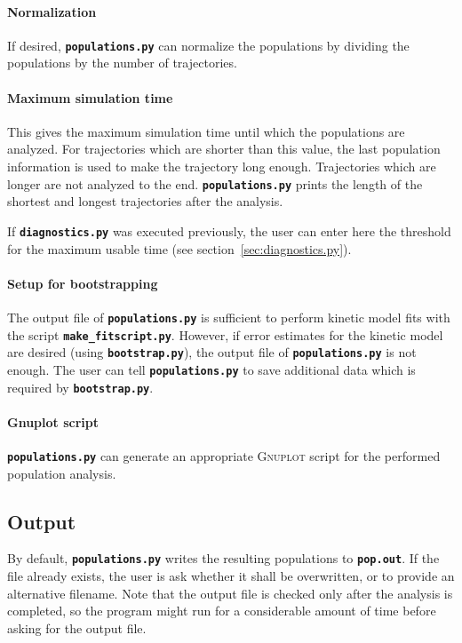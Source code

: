 \documentclass[a4paper,10pt,DIV=15,openany]{scrbook}
\newcommand{\ttt}[1]{\textbf{\texttt{#1}}}
\begin{document}
\paragraph{Normalization}

If desired, \ttt{populations.py} can normalize the populations by dividing the populations by the number of trajectories. 

\paragraph{Maximum simulation time}

This gives the maximum simulation time until which the populations are analyzed. For trajectories which are shorter than this value, the last population information is used to make the trajectory long enough. Trajectories which are longer are not analyzed to the end. \ttt{populations.py} prints the length of the shortest and longest trajectories after the analysis.

If \ttt{diagnostics.py} was executed previously, the user can enter here the threshold for the maximum usable time (see section~\ref{sec:diagnostics.py}).

\paragraph{Setup for bootstrapping}

The output file of \ttt{populations.py} is sufficient to perform kinetic model fits with the script \ttt{make\_fitscript.py}.
However, if error estimates for the kinetic model are desired (using \ttt{bootstrap.py}), the output file of \ttt{populations.py} is not enough.
The user can tell \ttt{populations.py} to save additional data which is required by \ttt{bootstrap.py}.

\paragraph{Gnuplot script}

\ttt{populations.py} can generate an appropriate \textsc{Gnuplot} script for the performed population analysis. 

\subsection{Output}

By default, \ttt{populations.py} writes the resulting populations to \ttt{pop.out}. If the file already exists, the user is ask whether it shall be overwritten, or to provide an alternative filename. Note that the output file is checked only after the analysis is completed, so the program might run for a considerable amount of time before asking for the output file.
\end{document}

